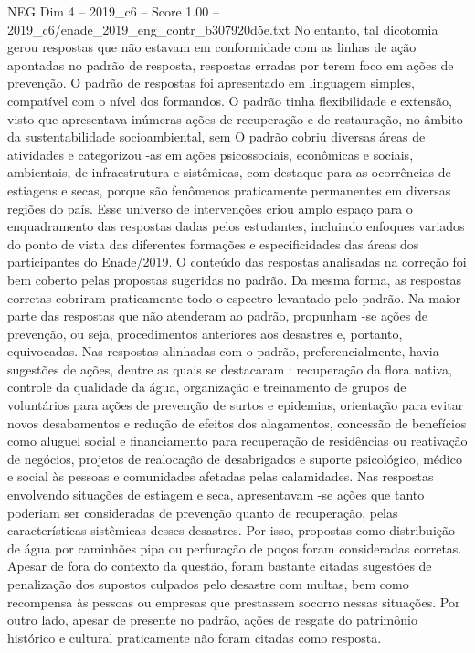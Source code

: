 \begin{textsample}{NEG Dim 4 – 2019\_c6 – Score 1.00 – 2019\_c6/enade\_2019\_eng\_contr\_b307920d5e.txt}
No entanto, tal dicotomia gerou respostas que não estavam em conformidade com as linhas de ação apontadas no padrão de resposta, respostas erradas por terem foco em ações de prevenção.
O padrão de respostas foi apresentado em linguagem simples, compatível com o nível dos formandos.
O padrão tinha flexibilidade e extensão, visto que apresentava inúmeras ações de recuperação e de restauração, no âmbito da sustentabilidade socioambiental, sem O padrão cobriu diversas áreas de atividades e categorizou -as em ações psicossociais, econômicas e sociais, ambientais, de infraestrutura e sistêmicas, com destaque para as ocorrências de estiagens e secas, porque são fenômenos praticamente permanentes em diversas regiões do país.
Esse universo de intervenções criou amplo espaço para o enquadramento das respostas dadas pelos estudantes, incluindo enfoques variados do ponto de vista das diferentes formações e especificidades das áreas dos participantes do Enade/2019.
O conteúdo das respostas analisadas na correção foi bem coberto pelas propostas sugeridas no padrão.
Da mesma forma, as respostas corretas cobriram praticamente todo o espectro levantado pelo padrão.
Na maior parte das respostas que não atenderam ao padrão, propunham -se ações de prevenção, ou seja, procedimentos anteriores aos desastres e, portanto, equivocadas.
Nas respostas alinhadas com o padrão, preferencialmente, havia sugestões de ações, dentre as quais se destacaram : recuperação da flora nativa, controle da qualidade da água, organização e treinamento de grupos de voluntários para ações de prevenção de surtos e epidemias, orientação para evitar novos desabamentos e redução de efeitos dos alagamentos, concessão de benefícios como aluguel social e financiamento para recuperação de residências ou reativação de negócios, projetos de realocação de desabrigados e suporte psicológico, médico e social às pessoas e comunidades afetadas pelas calamidades.
Nas respostas envolvendo situações de estiagem e seca, apresentavam -se ações que tanto poderiam ser consideradas de prevenção quanto de recuperação, pelas características sistêmicas desses desastres.
Por isso, propostas como distribuição de água por caminhões pipa ou perfuração de poços foram consideradas corretas.
Apesar de fora do contexto da questão, foram bastante citadas sugestões de penalização dos supostos culpados pelo desastre com multas, bem como recompensa às pessoas ou empresas que prestassem socorro nessas situações.
Por outro lado, apesar de presente no padrão, ações de resgate do patrimônio histórico e cultural praticamente não foram citadas como resposta.

\end{textsample}
